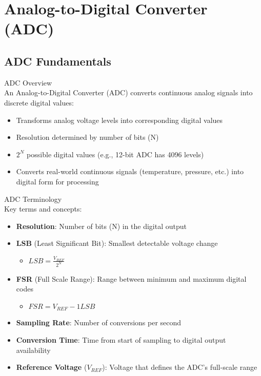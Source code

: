 \section{Analog-to-Digital Converter (ADC)}

\subsection{ADC Fundamentals}

\begin{concept}{ADC Overview}\\
An Analog-to-Digital Converter (ADC) converts continuous analog signals into discrete digital values:
\begin{itemize}
    \item Transforms analog voltage levels into corresponding digital values
    \item Resolution determined by number of bits (N)
    \item $2^N$ possible digital values (e.g., 12-bit ADC has 4096 levels)
    \item Converts real-world continuous signals (temperature, pressure, etc.) into digital form for processing
\end{itemize}
\end{concept}

\begin{definition}{ADC Terminology}\\
Key terms and concepts:
\begin{itemize}
    \item \textbf{Resolution}: Number of bits (N) in the digital output
    \item \textbf{LSB} (Least Significant Bit): Smallest detectable voltage change
    \begin{itemize}
        \item $LSB = \frac{V_{REF}}{2^N}$
    \end{itemize}
    \item \textbf{FSR} (Full Scale Range): Range between minimum and maximum digital codes
    \begin{itemize}
        \item $FSR = V_{REF} - 1 LSB$
    \end{itemize}
    \item \textbf{Sampling Rate}: Number of conversions per second
    \item \textbf{Conversion Time}: Time from start of sampling to digital output availability
    \item \textbf{Reference Voltage} ($V_{REF}$): Voltage that defines the ADC's full-scale range
\end{itemize}
\end{definition}

